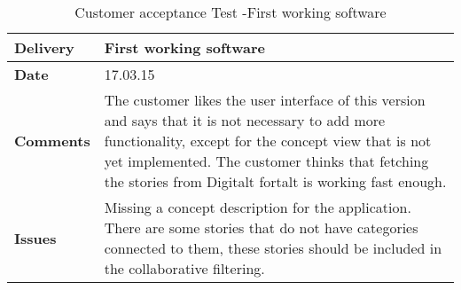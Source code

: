 \renewcommand{\arraystretch}{2}%
\begin{center}
	\begin{longtable}{ | p{4cm} | p{13cm} | }
		
		\caption[Customer acceptance test]{Customer acceptance Test -First working software } \label{Tab:cattest3}\\
		\hline
		\textbf{Delivery} & First working software\\ \hline
		\textbf{Date} & 17.03.15 \\ \hline
		\textbf{Comments} & The customer likes the user interface of this version and says that it is not necessary to add more functionality, except for the concept view that is not yet implemented. The customer thinks that fetching the stories from Digitalt fortalt is working fast enough.  \\ \hline			
		\textbf{Issues} & 
		Missing a concept description for the application. There are some stories that do not have categories connected to them, these stories should be included in the collaborative filtering.
		\\ \hline		
	\end{longtable}
\end{center}

